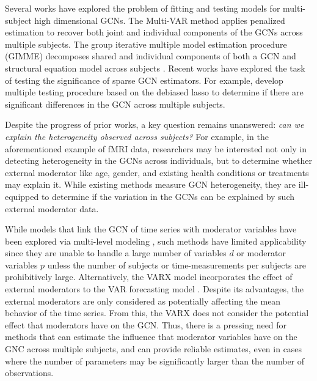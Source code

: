 Several works have explored the problem of fitting and testing models for multi-subject high dimensional GCNs. The Multi-VAR method \citep{fisher2022penalized,fisher2024structured} applies penalized estimation to recover both joint and individual components of the GCNs across multiple subjects. The group iterative multiple model estimation procedure (GIMME) decomposes shared and individual components of both a GCN and structural equation model across subjects \citep{gates2012group,lane2019uncovering,lee2026group}. Recent works have explored the task of testing the significance of sparse GCN estimators. For example, \citet{zhu2022confidence,uematsu2025discovering} develop multiple testing procedure based on the debiased lasso \citep{vandeGeer2014debiasing,zhang2014confidence,javanmard2014confidence} to determine if there are significant differences in the GCN across multiple subjects. 

Despite the progress of prior works, a key question remains unanswered: \textit{can we explain the heterogeneity observed across subjects?} For example, in the aforementioned example of fMRI data, researchers may be interested not only in detecting heterogeneity in the GCNs across individuals, but to determine whether external moderator like age, gender, and existing health conditions or treatments may explain it. While existing methods measure GCN heterogeneity, they are ill-equipped to determine if the variation in the GCNs can be explained by such external moderator data. 


While models that link the GCN of time series with moderator variables have been explored via multi-level modeling \citep{song2014analyzing,li2022fitting}, such methods have limited applicability since they are unable to handle a large number of variables $d$ or moderator variables $p$ unless the number of subjects or time-measurements per subjects are prohibitively large. Alternatively, the VARX model incorporates the effect of external moderators to the VAR forecasting model \citep{nicholson2017varx,nicholson2023bigVAR}. Despite its advantages, the external moderators are only considered as potentially affecting the mean behavior of the time series. From this, the VARX does not consider the potential effect that moderators have on the GCN. Thus, there is a pressing need for methods that can estimate the influence that moderator variables have on the GNC across multiple subjects, and can provide reliable estimates, even in cases where the number of parameters may be significantly larger than the number of observations. 



